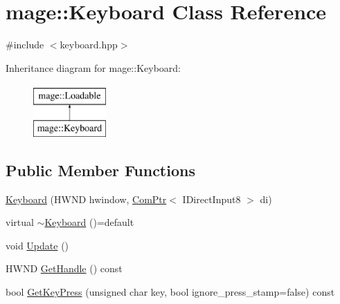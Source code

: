 \hypertarget{classmage_1_1_keyboard}{}\section{mage\+:\+:Keyboard Class Reference}
\label{classmage_1_1_keyboard}


{\ttfamily \#include $<$keyboard.\+hpp$>$}

Inheritance diagram for mage\+:\+:Keyboard\+:\begin{figure}[H]
\begin{center}
\leavevmode
\includegraphics[height=2.000000cm]{classmage_1_1_keyboard}
\end{center}
\end{figure}
\subsection*{Public Member Functions}
\begin{DoxyCompactItemize}
\item 
\hyperlink{classmage_1_1_keyboard_af4afb6c7992b88f94f4b310c35f7e867}{Keyboard} (H\+W\+ND hwindow, \hyperlink{namespacemage_ae74f374780900893caa5555d1031fd79}{Com\+Ptr}$<$ I\+Direct\+Input8 $>$ di)
\item 
virtual \hyperlink{classmage_1_1_keyboard_a72426c8e5cd32f8e79f283d5409f9cc4}{$\sim$\+Keyboard} ()=default
\item 
void \hyperlink{classmage_1_1_keyboard_abb5fd91a304f8bbf8b15ab1a277dafaf}{Update} ()
\item 
H\+W\+ND \hyperlink{classmage_1_1_keyboard_ab9d2244f94faccb9c745b07a8bebc888}{Get\+Handle} () const
\item 
bool \hyperlink{classmage_1_1_keyboard_a94d35ad5ad27e3fc9496f3ab1fa28e4d}{Get\+Key\+Press} (unsigned char key, bool ignore\+\_\+press\+\_\+stamp=false) const
\end{DoxyCompactItemize}
